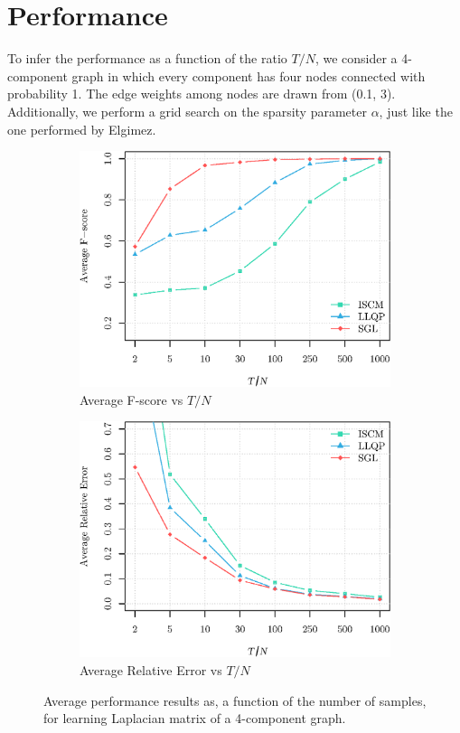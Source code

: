 \section{Performance}
To infer the performance as a function of the ratio $T/N$, we consider a 4-component graph in which every component has
four nodes connected with probability 1. The edge weights among nodes are drawn from (0.1, 3). Additionally,
we perform a grid search on the sparsity parameter $\alpha$, just like the one performed by Elgimez.

\begin{figure}[!htb]
  \begin{subfigure}[b]{0.45\textwidth}
      \includegraphics[width=\textwidth]{block-diagonal/fscore_block_diagonal.eps}
      \caption{Average F-score vs $T/N$}
  \end{subfigure}
  \begin{subfigure}[b]{0.45\textwidth}
      \includegraphics[width=\textwidth]{block-diagonal/relative_error_block_diagonal.eps}
      \caption{Average Relative Error vs $T/N$}
  \end{subfigure}
  \caption{Average performance results as, a function of the number of samples, for learning
           Laplacian matrix of a 4-component graph.}
  \label{fig:performance}
\end{figure}
